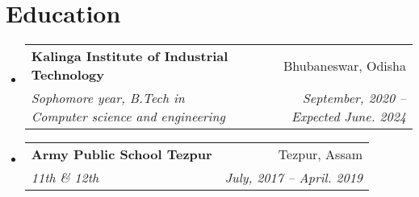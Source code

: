 \documentclass[letterpaper,11pt]{article}
\makeatletter
\newcommand{\resumeItem}[1]{
  \item\small{
    {#1 \vspace{-2pt}}
  }
}
\newcommand{\resumeSubheading}[4]{
  \vspace{-2pt}\item
    \begin{tabular*}{0.97\textwidth}[t]{l@{\extracolsep{\fill}}r}
      \textbf{#1} & #2 \\
      \textit{\small#3} & \textit{\small #4} \\
    \end{tabular*}\vspace{-7pt}
}
\newcommand{\resumeSubHeadingListStart}{\begin{itemize}[leftmargin=0.15in, label={}]}
\newcommand{\resumeSubHeadingListEnd}{\end{itemize}}
\newcommand{\resumeItemListStart}{\begin{itemize}}
\newcommand{\resumeItemListEnd}{\end{itemize}\vspace{-5pt}}
\makeatother
\begin{document}
 
\section{Education}
  \resumeSubHeadingListStart
    \resumeSubheading
      {Kalinga Institute of Industrial Technology}{Bhubaneswar, Odisha}
      {Sophomore year, B.Tech in Computer science and engineering}{September, 2020 -- Expected June. 2024}
  \resumeSubHeadingListEnd
    \resumeSubHeadingListStart
    \resumeSubheading
      {Army Public School Tezpur}{Tezpur, Assam}
      {11th \& 12th}{July, 2017 -- April. 2019}
  \resumeSubHeadingListEnd
\end{document}
